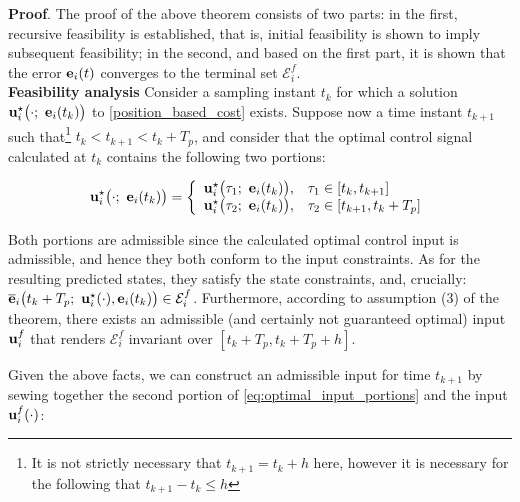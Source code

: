 \textbf{Proof}. The proof of the above theorem consists of two parts:
in the first, recursive feasibility is established, that is, initial
feasibility is shown to imply subsequent feasibility; in the second, and based
on the first part, it is shown that the error $\bm{\mathbf{e}}_i(t)$ converges to the
terminal set $\mathcal{E}_i^f$.\\

\textbf{Feasibility analysis}
Consider a sampling instant $t_k$ for which a
solution $\vect{u}_i^{\star}\big(\cdot;\ \vect{e}_i(t_k)\big)$ to
\eqref{position_based_cost} exists.
Suppose now a time instant $t_{k+1}$ such that\footnote{It is not strictly necessary
that $t_{k+1} = t_k + h$ here, however it is necessary for the following that
$t_{k+1} - t_k \leq h$} $t_k < t_{k+1} < t_k + T_p$, and consider that the
optimal control signal calculated at $t_k$ contains the following two portions:

\begin{equation}
  \vect{u}_i^{\star}\big(\cdot;\ \vect{e}_i(t_k)\big) = \left\{ \\
      \begin{array}{ll}
        \vect{u}_i^{\star}\big(\tau_1;\ \vect{e}_i(t_k)\big), & \tau_1 \in [t_k, t_{k+1}] \\
        \vect{u}_i^{\star}\big(\tau_2;\ \vect{e}_i(t_k)\big), & \tau_2 \in [t_{k+1}, t_k + T_p]
      \end{array}
      \right.
  \label{eq:optimal_input_portions}
\end{equation}

Both portions are admissible since the calculated optimal control input is
admissible, and hence they both conform to the input constraints.
As for the resulting predicted states, they satisfy the state constraints, and,
crucially: $\overline{\vect{e}}_i\big(t_k + T_p;\ \vect{u}_i^{\star}(\cdot), \vect{e}_i(t_k)\big) \in \mathcal{E}_i^f$.
Furthermore, according to assumption (3) of the theorem, there exists an
admissible (and certainly not guaranteed optimal) input $\bm{\mathbf{u}}_i^f$ that
renders $\mathcal{E}_i^f$ invariant over $[t_k + T_p, t_k + T_p + h]$.

Given the above facts, we can construct an admissible input for time $t_{k+1}$
by sewing together the second portion of \eqref{eq:optimal_input_portions}
and the input $\bm{\mathbf{u}}_i^f(\cdot)$:

